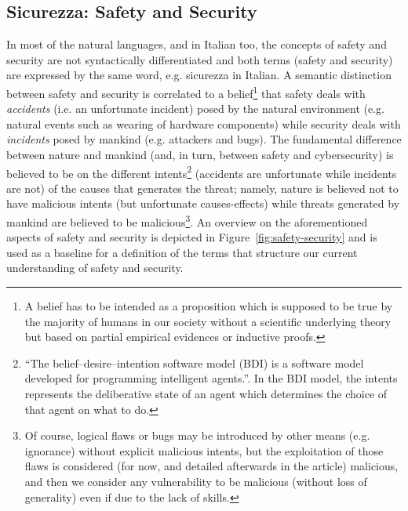\documentclass{article}
\theoremstyle{definition}
\theoremstyle{corollary}
\theoremstyle{lemma}
\theoremstyle{theorem}
\theoremstyle{theorem}
\begin{document}
\subsection{Sicurezza: Safety and Security}\label{sec:sicurezza}
In most of the natural languages, and in Italian too, the concepts of safety
and security are not syntactically differentiated and both terms (safety and
security) are expressed by the same word, e.g. sicurezza in Italian.  A
semantic distinction between safety and security is correlated to a
belief\footnote{A belief has to be intended as a proposition which is supposed
to be true by the majority of humans in our society without a scientific
underlying theory but based on partial empirical evidences or inductive proofs.} that
safety deals with \emph{accidents} (i.e. an unfortunate incident) posed by the
natural environment (e.g. natural events such as wearing of hardware
components) while security deals with \emph{incidents} posed by mankind (e.g.
attackers and bugs).  The fundamental difference between nature and mankind (and,
in turn, between safety and cybersecurity) is believed to be on the different
intents\footnote{``The belief–desire–intention software model (BDI) is a
software model developed for programming intelligent
agents.''\autocite{wiki-bdi}. In the BDI model, the intents represents the
deliberative state of an agent which determines the choice of that agent on
what to do.} (accidents are unfortunate while incidents are not) of the causes
that generates the threat; namely, nature is believed not to have malicious
intents (but unfortunate causes-effects) while threats generated by mankind are
believed to be malicious\footnote{Of course, logical flaws or bugs may be
introduced by other means (e.g. ignorance) without explicit malicious intents,
but the exploitation of those flaws is considered (for now, and detailed
afterwards in the article) malicious, and then we consider any vulnerability to
be malicious (without loss of generality) even if due to the lack of skills.}.
An overview on the aforementioned aspects of safety and security is depicted in
Figure~\ref{fig:safety-security} and is used as a baseline for a definition of
the terms that structure our current understanding of safety and security. 
\end{document}
